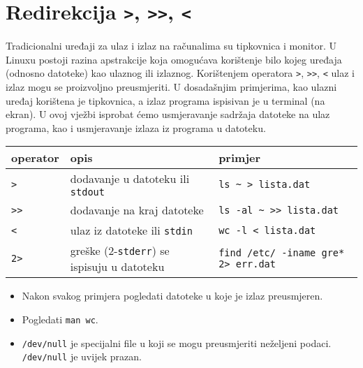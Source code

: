 \section{Redirekcija \lstinline!>!, \lstinline!>>!, \lstinline!<!}


Tradicionalni uređaji za ulaz i izlaz na računalima su tipkovnica i monitor. U Linuxu postoji razina apstrakcije koja omogućava korištenje bilo kojeg uređaja (odnosno datoteke) kao ulaznog ili izlaznog. Korištenjem operatora \lstinline!>!, \lstinline!>>!, \lstinline!<! ulaz i izlaz mogu se proizvoljno preusmjeriti. U dosadašnjim primjerima, kao ulazni uređaj korištena je tipkovnica, a izlaz programa ispisivan je u terminal (na ekran). U ovoj vježbi isprobat ćemo usmjeravanje sadržaja datoteke na ulaz programa, kao i usmjeravanje izlaza iz programa u datoteku.

\begin{tabularx}{\textwidth}{lXl}
\hline
operator & opis & primjer\\
\hline
\lstinline!>! & dodavanje u datoteku ili \texttt{stdout} &  \lstinline!ls ~ > lista.dat!\\
\lstinline!>>! & dodavanje na kraj datoteke & \lstinline!ls -al ~ >> lista.dat!\\
\lstinline!<! & ulaz iz datoteke ili \texttt{stdin} & \lstinline!wc -l < lista.dat!\\ 
\lstinline!2>! & greške (2-\texttt{stderr}) se ispisuju u datoteku & \lstinline!find /etc/ -iname gre* 2> err.dat!\\
\hline
\end{tabularx}

\begin{itemize}
 \item Nakon svakog primjera pogledati datoteke u koje je izlaz preusmjeren. 
 \item Pogledati \lstinline!man wc!.
 \item \lstinline!/dev/null! je specijalni file u koji se mogu preusmjeriti neželjeni podaci. \lstinline!/dev/null! je uvijek prazan.\\
\end{itemize}

